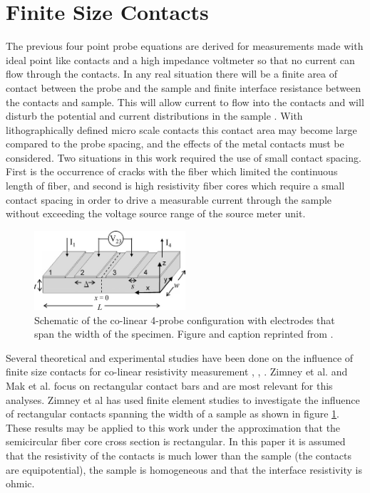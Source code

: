\section{Finite Size Contacts}
 The previous four point probe equations are derived for measurements made with ideal point like contacts and a high impedance voltmeter so that no current can flow through the contacts. In any real situation there will be a finite area of contact between the probe and the sample and finite interface resistance between the contacts and sample. This will allow current to flow into the contacts and will disturb the potential and current distributions in the sample \cite{Zimney2007CorrectionStudy}. With lithographically defined micro scale contacts this contact area may become large compared to the probe spacing, and the effects of the metal contacts must be considered. %
 Two situations in this work required the use of small contact spacing. First is the occurrence of cracks with the fiber which limited the continuous length of fiber, and second is high resistivity fiber cores which require a small contact spacing in order to drive a measurable current through the sample without exceeding the voltage source range of the source meter unit. 
 
  
\begin{figure}[h]
  \centering
    \includegraphics[width=0.5\textwidth]{fig/4pp/finite_size_contacts.png}
 \caption{Schematic of the co-linear 4-probe configuration with electrodes that span the width of the specimen. Figure and caption reprinted from \cite{Zimney2007CorrectionStudy}.}
\label{fig1}
\end{figure}

 Several theoretical and experimental studies have been done on the influence of finite size contacts for co-linear resistivity measurement \cite{Zimney2007CorrectionStudy}, \cite{Mak1989SpecificArsenide}, \cite{Ilse2014GeometricalMeasurements} \cite{Esposito2000DeterminationCrystals}. Zimney et al. and Mak et al. focus on rectangular contact bars and are most relevant for this analyses. Zimney et al has used finite element studies to investigate the influence of rectangular contacts spanning the width of a sample as shown in figure \ref{fig1}. These results may be applied to this work under the approximation that the semicircular fiber core cross section is rectangular. In this paper it is assumed that the resistivity of the contacts is much lower than the sample (the contacts are equipotential), the sample is homogeneous and that the interface resistivity is ohmic.%
 
